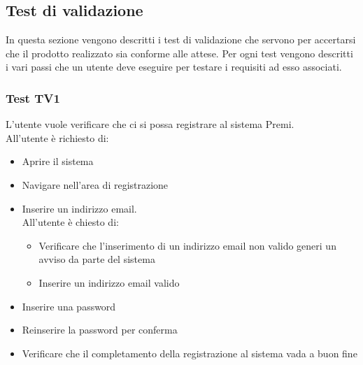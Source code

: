\subsection {Test di validazione}

In questa sezione vengono descritti i test di validazione che servono per accertarsi che il prodotto realizzato sia conforme alle attese. Per ogni test vengono descritti i vari passi che un utente deve eseguire per testare i requisiti ad esso associati.

\subsubsection {Test TV1} %
L'utente vuole verificare che ci si possa registrare al sistema Premi.\\
All'utente è richiesto di:
\begin{itemize}
	\item Aprire il sistema
	\item Navigare nell'area di registrazione
	\item Inserire un indirizzo email. \\
	         All'utente è chiesto di: 
	         \begin{itemize}
	         	\item Verificare che l'inserimento di un indirizzo email non valido generi un avviso da parte del sistema
	         	\item Inserire un indirizzo email valido
	         \end{itemize}
	\item Inserire una password
	\item Reinserire la password per conferma
	\item Verificare che il completamento della registrazione al sistema vada a buon fine
\end{itemize}

